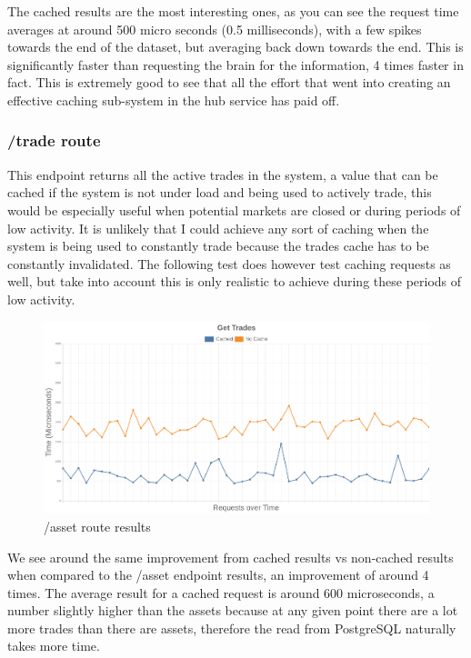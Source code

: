 \documentclass[titlepage]{article}
\begin{document}
The cached results are the most interesting ones, as you can see the request time averages at around 500 micro seconds (0.5 milliseconds), with a few spikes towards the end of the dataset, but averaging back down towards the end. This is significantly faster than requesting the brain for the information, 4 times faster in fact. This is extremely good to see that all the effort that went into creating an effective caching sub-system in the hub service has paid off.

\pagebreak
\subsubsection{/trade route}
This endpoint returns all the active trades in the system, a value that can be cached if the system is not under load and being used to actively trade, this would be especially useful when potential markets are closed or during periods of low activity. It is unlikely that I could achieve any sort of caching when the system is being used to constantly trade because the trades cache has to be constantly invalidated. The following test does however test caching requests as well, but take into account this is only realistic to achieve during these periods of low activity.

\begin{figure}[h!]
\includegraphics[width=\textwidth]{../results/get-trades.png}
  \caption{/asset route results}
\end{figure}

We see around the same improvement from cached results vs non-cached results when compared to the /asset endpoint results, an improvement of around 4 times. The average result for a cached request is around 600 microseconds, a number slightly higher than the assets because at any given point there are a lot more trades than there are assets, therefore the read from PostgreSQL naturally takes more time. \\
\end{document}
